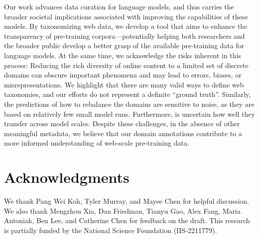 Our work advances data curation for language models, and thus carries the broader societal implications associated with improving the capabilities of these models. By taxonomizing web data, we develop a tool that aims to enhance the transparency of pre-training corpora---potentially helping both researchers and the broader public develop a better grasp of the available pre-training data for language models.
At the same time, we acknowledge the risks inherent in this process: Reducing the rich diversity of online content to a limited set of discrete domains can obscure important phenomena and may lead to errors, biases, or misrepresentations.
We highlight that there are many valid ways to define web taxonomies, and our efforts do not represent a definite ``ground truth''.
Similarly, the predictions of how to rebalance the domains are sensitive to noise, as they are based on relatively few small model runs. Furthermore, is uncertain how well they transfer across model scales.
Despite these challenges, in the absence of other meaningful metadata, 
we believe that our domain annotations contribute to a more informed understanding of web-scale pre-training data.

\section*{Acknowledgments}
We thank Pang Wei Koh, Tyler Murray, and Mayee Chen for helpful discussion. We also thank Mengzhou Xia, Dan Friedman, Tianyu Gao, Alex Fang, Maria Antoniak, Ben Lee, and Catherine Chen for feedback on the draft. 
This research is partially funded by the National Science Foundation (IIS-2211779).




